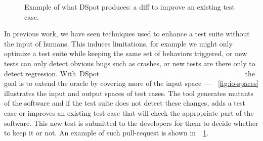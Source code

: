 \documentclass[11pt]{sdm}
\newcommand{\addref}[1]{\colorbox{TealBlue!100}{\textcolor{white}{\textbf{$[$\ifx&#1&\ \else#1\fi$]$}}}}
\newcommand{\dspot}{DSpot\xspace}
\begin{document}
\begin{figure}
  \centering
  \caption{Example of what \dspot{} produces: a diff to improve an existing test case.}
\label{fig:diff-protostuff}
\end{figure}

In previous work, we have seen techniques used to enhance a test suite without the input of humans.
This induces limitations, for example we might only optimize a test suite while keeping the same set of behaviors triggered, or new tests can only detect obvious bugs such as crashes, or new tests are there only to detect regression.
With~\dspot{}~\cite{baudry2015dspot}\addref{new dspot paper} the goal is to extend the oracle by covering more of the input space ---~\figurename~\ref{fig:io-spaces} illustrates the input and output spaces of test cases.
The tool generates mutants of the software and if the test suite does not detect these changes, adds a test case or improves an existing test case that will check the appropriate part of the software.
This new test is submitted to the developers for them to decide whether to keep it or not.
An example of such pull-request is shown in~\figurename~\ref{fig:diff-protostuff}.
\end{document}
